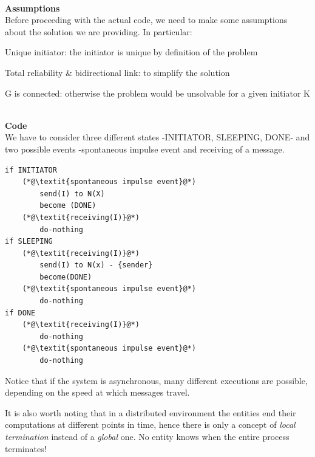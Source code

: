 \documentclass[paper=a4, fontsize=11pt]{scrartcl} %
\numberwithin{equation}{section} %
\numberwithin{figure}{section} %
\numberwithin{table}{section} %
\begin{document}
~ \\

\textbf{Assumptions}\\ 
Before proceeding with the actual code, we need to make some assumptions about the solution we are providing. In particular:
\begin{compactitem}
	\item Unique initiator: the initiator is unique by definition of the problem
	\item Total reliability \& bidirectional link: to simplify the solution
	\item G is connected: otherwise the problem would be unsolvable for a given initiator K
\end{compactitem}
~\\
\textbf{Code} 
\\ We have to consider three different states -INITIATOR, SLEEPING, DONE- and two possible events -spontaneous impulse event and receiving of a message.

\begin{lstlisting}
if INITIATOR
	(*@\textit{spontaneous impulse event}@*)
		send(I) to N(X)
		become (DONE)
	(*@\textit{receiving(I)}@*)
		do-nothing
if SLEEPING
	(*@\textit{receiving(I)}@*)
		send(I) to N(x) - {sender}
		become(DONE)
	(*@\textit{spontaneous impulse event}@*)
		do-nothing
if DONE
	(*@\textit{receiving(I)}@*)
		do-nothing
	(*@\textit{spontaneous impulse event}@*)
		do-nothing				
\end{lstlisting}

Notice that if the system is asynchronous, many different executions are possible, depending on the speed at which messages travel.

It is also worth noting that in a distributed environment the entities end their computations at different points in time, hence there is only a concept of \textit{local termination} instead of a \textit{global} one. No entity knows when the entire process terminates!
\end{document}
